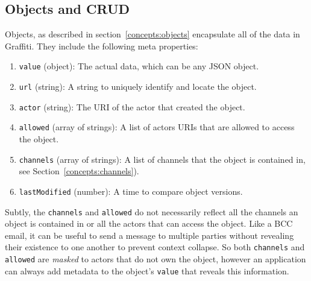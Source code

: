 
\subsection{Objects and CRUD}

Objects, as described in section~\ref{concepts:objects} encapsulate
all of the data in Graffiti.
They include the following meta properties:
\begin{enumerate}
\item
\texttt{value} (object): The actual data, which can be any JSON object.
\item
\texttt{url} (string): A string to uniquely identify and locate the object.
\item
\texttt{actor} (string): The URI of the actor that created the object.
\item
\texttt{allowed} (array of strings): A list of actors URIs that are allowed to access the object.
\item
\texttt{channels} (array of strings): A list of channels that the object is contained in, see Section~\ref{concepts:channels}).
\item
\texttt{lastModified} (number): A time to compare object versions.
\end{enumerate}

Subtly, the \texttt{channels} and \texttt{allowed} do not necessarily
reflect all the channels an object is contained in or
all the actors that can access the object.
Like a BCC email, it can be useful to send a message to multiple parties
without revealing their existence to one another to prevent
context collapse.
So both \texttt{channels} and \texttt{allowed} are \emph{masked} to
actors that do not own the object, however an application can always
add metadata to the object's \texttt{value} that reveals this information.

